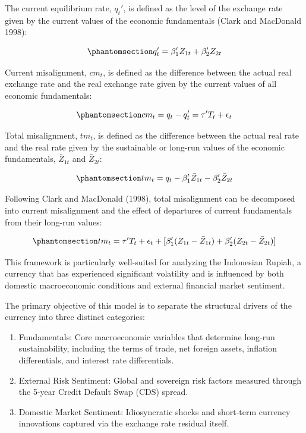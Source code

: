 \documentclass[
  manuscript=article,
  layout=publish,
  year=2026,
  volume=6,
]{den}
\providecommand{\tightlist}{%
  \setlength{\itemsep}{0pt}\setlength{\parskip}{0pt}}
\begin{document}
The current equilibrium rate, \(q_t'\), is defined as the level of the
exchange rate given by the current values of the economic fundamentals
(Clark and MacDonald 1998):

\begin{equation}\phantomsection\label{eq-current-equilibrium}{
q_t' = \beta_1'Z_{1t} + \beta_2'Z_{2t}
}\end{equation}

Current misalignment, \(cm_t\), is defined as the difference between the
actual real exchange rate and the real exchange rate given by the
current values of all economic fundamentals:

\begin{equation}\phantomsection\label{eq-current-misalignment}{
cm_t = q_t - q_t' = \tau'T_t + \epsilon_t
}\end{equation}

Total misalignment, \(tm_t\), is defined as the difference between the
actual real rate and the real rate given by the sustainable or long-run
values of the economic fundamentals, \(\bar{Z}_{1t}\) and
\(\bar{Z}_{2t}\):

\begin{equation}\phantomsection\label{eq-total-misalignment}{
tm_t = q_t - \beta_1'\bar{Z}_{1t} - \beta_2'\bar{Z}_{2t}
}\end{equation}

Following Clark and MacDonald (1998), total misalignment can be
decomposed into current misalignment and the effect of departures of
current fundamentals from their long-run values:

\begin{equation}\phantomsection\label{eq-misalignment-decomposition}{
tm_t = \tau'T_t + \epsilon_t + [\beta_1'(Z_{1t} - \bar{Z}_{1t}) + \beta_2'(Z_{2t} - \bar{Z}_{2t})]
}\end{equation}

This framework is particularly well-suited for analyzing the Indonesian
Rupiah, a currency that has experienced significant volatility and is
influenced by both domestic macroeconomic conditions and external
financial market sentiment.

The primary objective of this model is to separate the structural
drivers of the currency into three distinct categories:

\begin{enumerate}
\def\labelenumi{\arabic{enumi}.}
\tightlist
\item
  Fundamentals: Core macroeconomic variables that determine long-run
  sustainability, including the terms of trade, net foreign assets,
  inflation differentials, and interest rate differentials.
\item
  External Risk Sentiment: Global and sovereign risk factors measured
  through the 5-year Credit Default Swap (CDS) spread.
\item
  Domestic Market Sentiment: Idiosyncratic shocks and short-term
  currency innovations captured via the exchange rate residual itself.
\end{enumerate}
\end{document}
